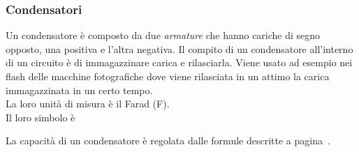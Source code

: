 \subsubsection{Condensatori}
Un condensatore è composto da due \emph{armature} che hanno cariche di segno opposto, una positiva
e l'altra negativa. Il compito di un condensatore all'interno di un circuito è di immagazzinare 
carica e rilasciarla. Viene usato ad esempio nei flash delle macchine fotografiche dove viene
rilasciata in un attimo la carica immagazzinata in un certo tempo.\\
La loro unità di misura è il Farad (F).\\
Il loro simbolo è
\begin{center}
\end{center}
La capacità di un condensatore è regolata dalle formule descritte a 
pagina~\pageref{sub:elettrostatica:capacita}.

